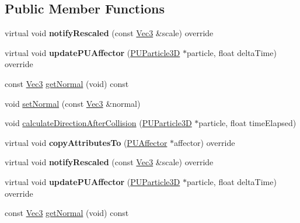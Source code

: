 \subsection*{Public Member Functions}
\begin{DoxyCompactItemize}
\item 
\mbox{\label{classPUPlaneCollider_a20b70abaa50dc8882631fa2374042334}} 
virtual void {\bfseries notify\+Rescaled} (const \hyperlink{classVec3}{Vec3} \&scale) override
\item 
\mbox{\label{classPUPlaneCollider_a91d6bb7cdfa199b31a0f80e527e5aef6}} 
virtual void {\bfseries update\+P\+U\+Affector} (\hyperlink{structPUParticle3D}{P\+U\+Particle3D} $\ast$particle, float delta\+Time) override
\item 
const \hyperlink{classVec3}{Vec3} \hyperlink{classPUPlaneCollider_a879ccfbdc354faaf0390c28470739e74}{get\+Normal} (void) const
\item 
void \hyperlink{classPUPlaneCollider_a527e29896ed1c6a741dad6225ba650b5}{set\+Normal} (const \hyperlink{classVec3}{Vec3} \&normal)
\item 
void \hyperlink{classPUPlaneCollider_ae1db8e838bd51116e32d02859216f384}{calculate\+Direction\+After\+Collision} (\hyperlink{structPUParticle3D}{P\+U\+Particle3D} $\ast$particle, float time\+Elapsed)
\item 
\mbox{\label{classPUPlaneCollider_a69ce34c9dd2c7a496488cff4ee939a39}} 
virtual void {\bfseries copy\+Attributes\+To} (\hyperlink{classPUAffector}{P\+U\+Affector} $\ast$affector) override
\item 
\mbox{\label{classPUPlaneCollider_a717b8ca9f377bb955afec8e6793fe5be}} 
virtual void {\bfseries notify\+Rescaled} (const \hyperlink{classVec3}{Vec3} \&scale) override
\item 
\mbox{\label{classPUPlaneCollider_a166ee6590b0f232da6e8307f18a8a92f}} 
virtual void {\bfseries update\+P\+U\+Affector} (\hyperlink{structPUParticle3D}{P\+U\+Particle3D} $\ast$particle, float delta\+Time) override
\item 
const \hyperlink{classVec3}{Vec3} \hyperlink{classPUPlaneCollider_a879ccfbdc354faaf0390c28470739e74}{get\+Normal} (void) const
\item 

\end{DoxyCompactItemize}
